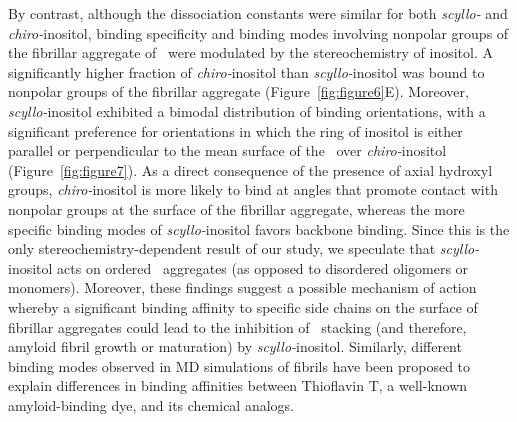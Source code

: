 By contrast, although the dissociation constants were similar for both \textit{scyllo-} and \textit{chiro-}inositol, binding specificity and binding modes involving nonpolar groups of the fibrillar aggregate of \gafour\ were modulated by the stereochemistry of inositol. A significantly higher fraction of \textit{chiro-}inositol than \textit{scyllo-}inositol was bound to nonpolar groups of the fibrillar aggregate (Figure~\ref{fig:figure6}E). Moreover, \textit{scyllo-}inositol exhibited a bimodal distribution of binding orientations, with a significant preference for orientations in which the ring of inositol is either parallel or perpendicular to the mean surface of the \bsheet\ over \textit{chiro-}inositol (Figure~\ref{fig:figure7}). As a direct consequence of the presence of axial hydroxyl groups, \textit{chiro-}inositol is more likely to bind at angles that promote contact with nonpolar groups at the surface of the fibrillar aggregate, whereas the more specific binding modes of \textit{scyllo-}inositol favors backbone binding. Since this is the only stereochemistry-dependent result of our study, we speculate that \textit{scyllo-}inositol acts on ordered \bsheet\ aggregates (as opposed to disordered oligomers or monomers). Moreover, these findings suggest a possible mechanism of action whereby a significant binding affinity to specific side chains on the surface of fibrillar aggregates could lead to the inhibition of \bsheet\ stacking (and therefore, amyloid fibril growth or maturation) by \textit{scyllo-}inositol. Similarly, different binding modes observed in MD simulations of  fibrils have been proposed to explain differences in binding affinities between Thioflavin T, a well-known amyloid-binding dye, and its chemical analogs.\cite{Mathis:2003p55,Wu:2011p24}

